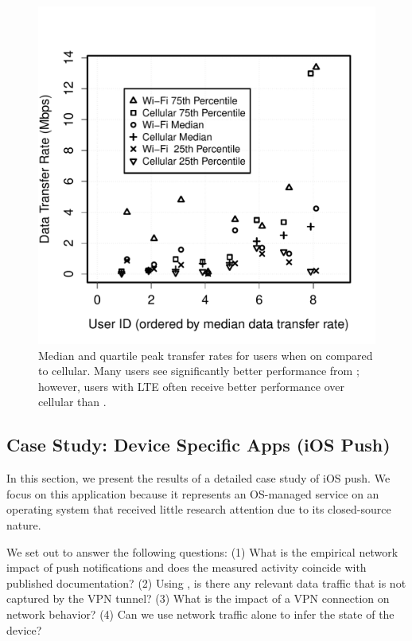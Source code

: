 \begin{figure}
\centering
        \includegraphics[width=\linewidth]{./plots/dataRate.pdf}
  \caption{Median and quartile peak transfer rates for users when on \wifi 
  compared to cellular. Many users see significantly better performance 
  from \wifi; however, users with LTE often receive better performance over 
  cellular than \wifi.}
  \label{fig:datarates}
\end{figure}

\subsection{Case Study: Device Specific Apps (iOS Push)}
\label{sec:case-study-ios}

In this section, we present the results of a detailed case study 
of iOS push. We focus on this application because it represents 
an OS-managed service on an operating system that received 
little research attention due to its closed-source nature. 

We set out to answer the following questions: (1) What is the 
empirical network impact of push notifications and does the 
measured activity coincide with published documentation?
(2) Using \meddle, is there any relevant data traffic that is 
not captured by the VPN tunnel? (3) What is the impact of 
a VPN connection on network behavior? (4) Can we use 
network traffic alone to infer the state of the device?

